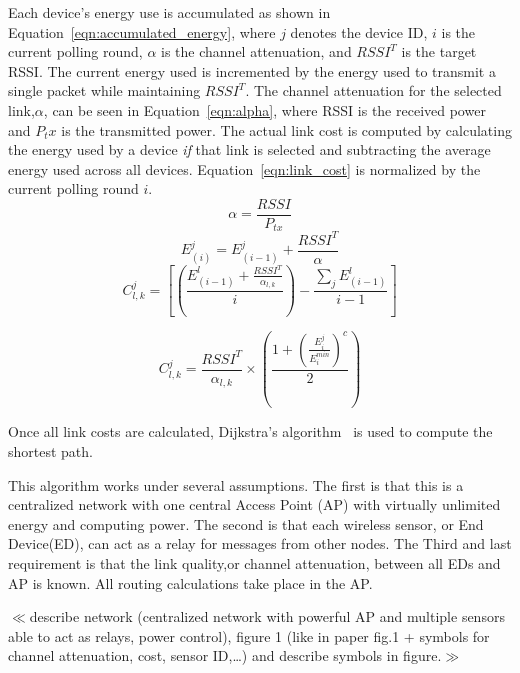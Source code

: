 \documentclass{article}
\begin{document}
Each device's energy use is accumulated as shown in Equation~\ref{eqn:accumulated_energy}, where $j$ denotes the device ID, $i$ is the current polling round, $\alpha$ is the channel attenuation, and $RSSI^T$ is the target RSSI. The current energy used is incremented by the energy used to transmit a single packet while maintaining $RSSI^T$. The channel attenuation for the selected link,$\alpha$, can be seen in Equation~\ref{eqn:alpha}, where RSSI is the received power and $P_tx$ is the transmitted power. The actual link cost is computed by calculating the energy used by a device \emph{if} that link is selected and subtracting the average energy used across all devices. Equation~\ref{eqn:link_cost} is normalized by the current polling round $i$.
\begin{equation}
\label{eqn:alpha}
\alpha = \frac{RSSI}{P_{tx}}
\end{equation}
\begin{equation}
\label{eqn:accumulated_energy}
E^j_{(i)} = E^j_{(i-1)} + \frac{RSSI^T}{\alpha}
\end{equation}
\begin{equation}
\label{eqn:link_cost}
C^j_{l,k} = \left[ \left(\frac{ E^l_{(i-1)} + \frac{RSSI^T}{\alpha_{l,k}}}{i}\right) - \frac{\sum_jE^l_{(i-1)}}{i-1} \right]
\end{equation}

\begin{equation}
\label{eqn:link_cost}
C^j_{l,k} = \frac{RSSI^T}{\alpha_{l,k}} \times \left( \frac{1+\left(\frac{E^j_i}{E^{min}_{i}} \right)^c}{2} \right)
\end{equation}

Once all link costs are calculated, Dijkstra's algorithm~\cite{dijkstra:algorithm} is used to compute the shortest path.

This algorithm works under several assumptions. The first is that this is a centralized network with one central Access Point (AP) with virtually unlimited energy and  computing power. The second is that each wireless sensor, or End Device(ED), can act as a relay for messages from other nodes. The Third and last requirement is that the link quality,or channel attenuation, between all EDs and AP is known. All routing calculations take place in the AP.

$\ll$describe network (centralized network with powerful AP and multiple sensors able to act as relays, power control), figure 1 (like in paper fig.1 + symbols for channel attenuation, cost, sensor ID,…) and describe symbols in figure.$\gg$
\end{document}
